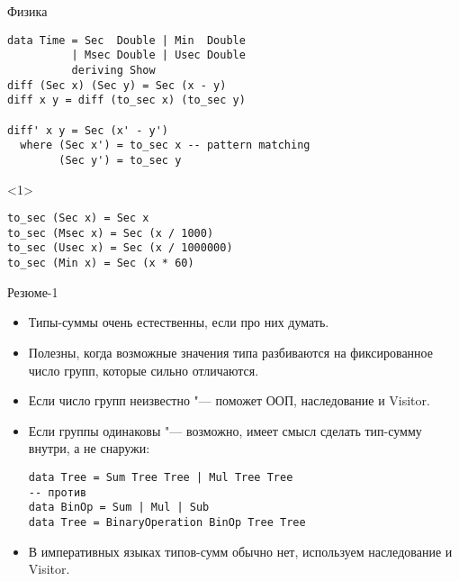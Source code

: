 \begin{frame}[t,fragile]{Физика}
\begin{verbatim}
data Time = Sec  Double | Min  Double
          | Msec Double | Usec Double
          deriving Show
diff (Sec x) (Sec y) = Sec (x - y)
diff x y = diff (to_sec x) (to_sec y)

diff' x y = Sec (x' - y')
  where (Sec x') = to_sec x -- pattern matching
        (Sec y') = to_sec y
\end{verbatim}
	\begin{onlyenv}
\begin{verbatim}
to_sec (Sec x) = Sec x
to_sec (Msec x) = Sec (x / 1000)
to_sec (Usec x) = Sec (x / 1000000)
to_sec (Min x) = Sec (x * 60)
\end{verbatim}
	\end{onlyenv}
\end{frame}

\begin{frame}[fragile]{Резюме-1}
	\begin{itemize}
		\item Типы-суммы очень естественны, если про них думать.
		\item Полезны, когда возможные значения типа разбиваются на фиксированное число групп, которые сильно отличаются.
		\item Если число групп неизвестно "--- поможет ООП, наследование и Visitor.
		\item Если группы одинаковы "--- возможно, имеет смысл сделать тип-сумму внутри, а не снаружи:
\begin{verbatim}
data Tree = Sum Tree Tree | Mul Tree Tree
-- против
data BinOp = Sum | Mul | Sub
data Tree = BinaryOperation BinOp Tree Tree
\end{verbatim}
		\item В императивных языках типов-сумм обычно нет, используем наследование и Visitor.
	\end{itemize}
\end{frame}

